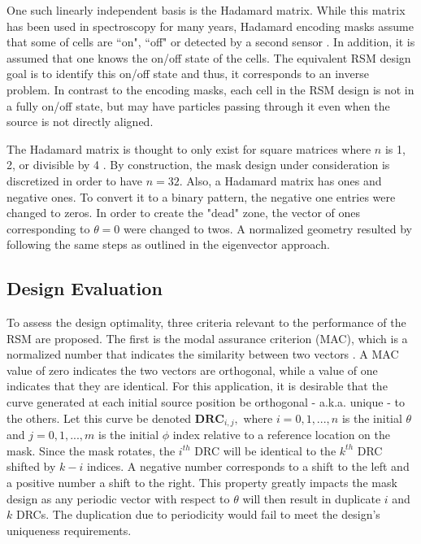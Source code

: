 \documentclass[3p,times]{elsarticle}
\begin{document}
One such linearly independent basis is the Hadamard matrix.  
While this matrix has been used in spectroscopy for many years, Hadamard encoding masks assume that some of cells are ``on", ``off" or detected by a second sensor \cite{DeVerse00}.  
In addition, it is assumed that one knows the on/off state of the cells.  
The equivalent RSM design goal is to identify this on/off state and thus, it corresponds to an inverse problem.  
In contrast to the encoding masks, each cell in the RSM design is not in a fully on/off state, but may have particles passing through it even when the source is not directly aligned.

The Hadamard matrix is thought to only exist for square matrices where $n$ is 1, 2, or divisible by 4 \cite{Sloane76}.  
By construction, the mask design under consideration is discretized in order to have $n=32$.  
Also, a Hadamard matrix has ones and negative ones.  
To convert it to a binary pattern, the negative one entries were changed to zeros.
In order to create the "dead" zone, the vector of ones corresponding to $\theta=0$ were changed to twos.  
A normalized geometry resulted by following the same steps as outlined in the eigenvector approach.

\subsection{Design Evaluation}
\label{sec:Eval}
To assess the design optimality, three criteria relevant to the performance of the RSM are proposed.  
The first is the modal assurance criterion (MAC), which is a normalized number that indicates the similarity between two vectors \cite{Allemang03}.  
A MAC value of zero indicates the two vectors are orthogonal, while a value of one indicates that they are identical.  
For this application, it is desirable that the curve generated at each initial source position be orthogonal - a.k.a. unique - to the others.  
Let this curve be denoted $\mathbf{DRC}_{i,j},$ where $i=0,1,...,n$ is the initial $\theta$ and $j=0,1,...,m$ is the initial $\phi$ index relative to a reference location on the mask.  
Since the mask rotates, the $i^{th}$ DRC will be identical to the $k^{th}$ DRC shifted by $k-i$ indices.  
A negative number corresponds to a shift to the left and a positive number a shift to the right.  
This property greatly impacts the mask design as any periodic vector with respect to $\theta$ will then result in duplicate $i$ and $k$ DRCs.  
The duplication due to periodicity would fail to meet the design's uniqueness requirements.
\end{document}

